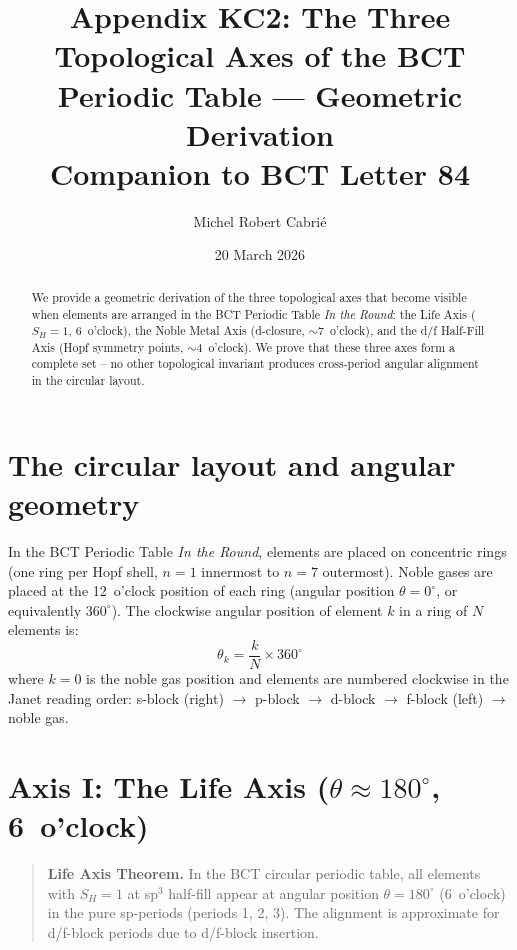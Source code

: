 \documentclass[aps,prl,onecolumn,superscriptaddress]{revtex4-2}
\begin{document}
\title{Appendix KC2: The Three Topological Axes of the BCT Periodic Table ---
Geometric Derivation\\
\normalsize Companion to BCT Letter 84}

\author{Michel Robert Cabri\'{e}}

\date{20 March 2026}

\begin{abstract}
We provide a geometric derivation of the three topological axes
that become visible when elements are arranged in the BCT Periodic
Table \emph{In the Round}: the Life Axis ($S_H = 1$, 6~o'clock),
the Noble Metal Axis (d-closure, $\sim$7~o'clock), and the
d/f Half-Fill Axis (Hopf symmetry points, $\sim$4~o'clock).
We prove that these three axes form a complete set -- no other
topological invariant produces cross-period angular alignment
in the circular layout.
\end{abstract}

\maketitle

\section{The circular layout and angular geometry}

In the BCT Periodic Table \emph{In the Round}, elements are placed
on concentric rings (one ring per Hopf shell, $n=1$ innermost to
$n=7$ outermost). Noble gases are placed at the 12~o'clock
position of each ring (angular position $\theta = 0^\circ$,
or equivalently $360^\circ$). The clockwise angular position
of element $k$ in a ring of $N$ elements is:
%
\begin{equation}
  \theta_k = \frac{k}{N} \times 360^\circ
  \label{eq:theta}
\end{equation}
%
where $k = 0$ is the noble gas position and elements are numbered
clockwise in the Janet reading order:
s-block (right) $\to$ p-block $\to$ d-block $\to$ f-block (left)
$\to$ noble gas.

\section{Axis I: The Life Axis ($\theta \approx 180^\circ$, 6~o'clock)}

\begin{quotation}
\textbf{Life Axis Theorem.}
In the BCT circular periodic table, all elements with
$S_H = 1$ at sp$^3$ half-fill appear at angular position
$\theta = 180^\circ$ (6~o'clock) in the pure sp-periods
(periods 1, 2, 3). The alignment is approximate for
d/f-block periods due to d/f-block insertion.
\end{quotation}
\end{document}
